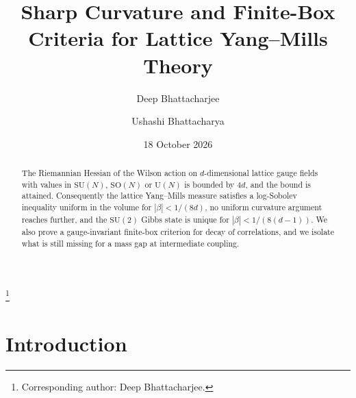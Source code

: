 \documentclass[11pt]{amsart}
\theoremstyle{definition}
\theoremstyle{remark}
\newcommand{\SU}{\mathrm{SU}}
\newcommand{\SO}{\mathrm{SO}}
\newcommand{\U}{\mathrm{U}}
\begin{document}
\title{Sharp Curvature and Finite-Box Criteria for Lattice Yang--Mills Theory}

\author{Deep Bhattacharjee}
\address{Formerly, Electro-Gravitational Space Propulsion Laboratory (EGSPL),
Bhubaneswar, Odisha 751030, India}
\address{Formerly, University of Calcutta, Senate House, 87/1 College Street,
Kolkata 700073, West Bengal, India}
\thanks{Corresponding author: Deep Bhattacharjee.}

\author{Ushashi Bhattacharya}
\address{Formerly, National Taiwan University, Taipei 106319, Taiwan}

\date{18 October 2026}

\begin{abstract}
The Riemannian Hessian of the Wilson action on $d$-dimensional lattice gauge
fields with values in $\SU(N)$, $\SO(N)$ or $\U(N)$ is bounded by $4d$, and the
bound is attained. Consequently the lattice Yang--Mills measure satisfies a
log-Sobolev inequality uniform in the volume for $|\beta|<1/(8d)$, no uniform
curvature argument reaches further, and the $\SU(2)$ Gibbs state is unique for
$|\beta|<1/(8(d-1))$. We also prove a gauge-invariant finite-box criterion for
decay of correlations, and we isolate what is still missing for a mass gap at
intermediate coupling.
\end{abstract}

\maketitle

\section{Introduction}
\end{document}
